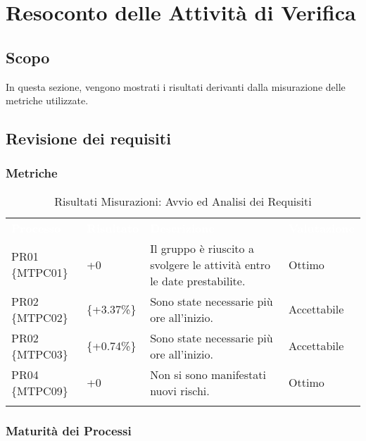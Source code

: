 \section{Resoconto delle Attività di Verifica}

\label{Resoconto}
\subsection{Scopo}

In questa sezione, vengono mostrati i risultati derivanti dalla misurazione delle metriche utilizzate.

\subsection{Revisione dei requisiti}


\subsubsection{Metriche}

\begin{longtable}{|C{.16\textwidth}|C{.16\textwidth}|C{.36\textwidth}|C{.20\textwidth}|}
\hline
{}\textbf{\textcolor{white}{Processo}} & \textbf{\textcolor{white}{Risultato}} & \textbf{\textcolor{white}{Descrizione}} & \textbf{\textcolor{white}{Valutazione}}\\
PR01 \{MTPC01\} & +0 & Il gruppo è riuscito a svolgere le attività entro le date prestabilite. & Ottimo \\
\hline

PR02 \{MTPC02\} &  \{+3.37\%\} & Sono state necessarie più ore all'inizio. & Accettabile\\
\hline

PR02 \{MTPC03\} &  \{+0.74\%\} & Sono state necessarie più ore all'inizio. & Accettabile\\
\hline

PR04 \{MTPC09\} & +0 & Non si sono manifestati nuovi rischi. & Ottimo\\
\hline

\caption{Risultati Misurazioni: Avvio ed Analisi dei Requisiti}
\label{ris:aar}
\end{longtable}

\subsubsection{Maturità dei Processi}

